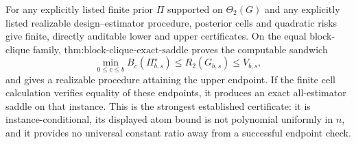 For any explicitly listed finite prior \(\Pi\) supported on \(\Theta_2(G)\) and any explicitly listed realizable design--estimator procedure, posterior cells and quadratic risks give finite, directly auditable lower and upper certificates. On the equal block-clique family, \(\text{thm:block-clique-exact-saddle}\) proves the computable sandwich
\[
\min_{0\le c\le b}B_c(\Pi_{b,s}^{\star})\le R_2(G_{b,s})\le V_{b,s},
\]
and gives a realizable procedure attaining the upper endpoint. If the finite cell calculation verifies equality of these endpoints, it produces an exact all-estimator saddle on that instance. This is the strongest established certificate: it is instance-conditional, its displayed atom bound is not polynomial uniformly in \(n\), and it provides no universal constant ratio away from a successful endpoint check.